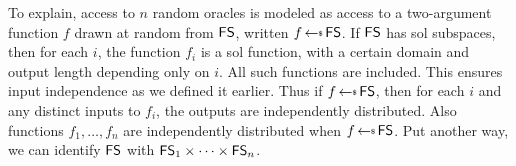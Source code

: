 



To explain, access to $n$ random oracles is modeled as access to a two-argument function $f$ drawn at random from $\mathsf{FS}$, written $f \getsr\roSp$. If $\mathsf{FS}$ has sol subspaces, then for each $i$, the function $f_i$ is a sol function, with a certain domain and output length depending only on $i$.
All such functions are included. This ensures input independence as we defined it earlier. Thus if $f \getsr\roSp$, then for each $i$ and any distinct inputs to $f_i$, the outputs are independently distributed. Also functions $f_1,\ldots,f_n$ are independently distributed when $f \getsr\roSp$. Put another way, we can identify $\mathsf{FS}$ with $\mathsf{FS}_1\times\cdots\times\mathsf{FS}_n$. 

